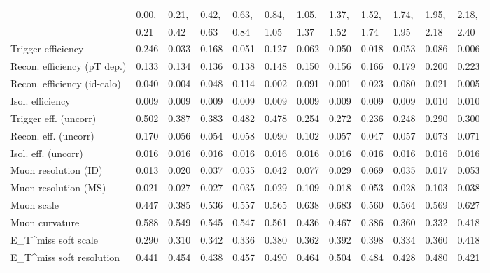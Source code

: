 \begin{tabular}{l|p{0.6cm}p{0.6cm}p{0.6cm}p{0.6cm}p{0.6cm}p{0.6cm}p{0.6cm}p{0.6cm}p{0.6cm}p{0.6cm}p{0.6cm}}
\hline
   & 0.00, & 0.21, & 0.42, & 0.63, & 0.84, & 1.05, & 1.37, & 1.52, & 1.74, & 1.95, & 2.18,  \\ 
   & 0.21 & 0.42 & 0.63 & 0.84 & 1.05 & 1.37 & 1.52 & 1.74 & 1.95 & 2.18 & 2.40  \\ 
\hline
Trigger efficiency                       & 0.246 & 0.033 & 0.168 & 0.051 & 0.127 & 0.062 & 0.050 & 0.018 & 0.053 & 0.086 & 0.006 \\
Recon. efficiency (pT dep.)              & 0.133 & 0.134 & 0.136 & 0.138 & 0.148 & 0.150 & 0.156 & 0.166 & 0.179 & 0.200 & 0.223 \\
Recon. efficiency (id-calo)              & 0.040 & 0.004 & 0.048 & 0.114 & 0.002 & 0.091 & 0.001 & 0.023 & 0.080 & 0.021 & 0.005 \\
Isol. efficiency                         & 0.009 & 0.009 & 0.009 & 0.009 & 0.009 & 0.009 & 0.009 & 0.009 & 0.009 & 0.010 & 0.010 \\
Trigger eff. (uncorr)                    & 0.502 & 0.387 & 0.383 & 0.482 & 0.478 & 0.254 & 0.272 & 0.236 & 0.248 & 0.290 & 0.300 \\
Recon. eff. (uncorr)                     & 0.170 & 0.056 & 0.054 & 0.058 & 0.090 & 0.102 & 0.057 & 0.047 & 0.057 & 0.073 & 0.071 \\
Isol. eff. (uncorr)                      & 0.016 & 0.016 & 0.016 & 0.016 & 0.016 & 0.016 & 0.016 & 0.016 & 0.016 & 0.016 & 0.016 \\
Muon resolution (ID)                     & 0.013 & 0.020 & 0.037 & 0.035 & 0.042 & 0.077 & 0.029 & 0.069 & 0.035 & 0.017 & 0.053 \\
Muon resolution (MS)                     & 0.021 & 0.027 & 0.027 & 0.035 & 0.029 & 0.109 & 0.018 & 0.053 & 0.028 & 0.103 & 0.038 \\
Muon scale                               & 0.447 & 0.385 & 0.536 & 0.557 & 0.565 & 0.638 & 0.683 & 0.560 & 0.564 & 0.569 & 0.627 \\
Muon curvature                           & 0.588 & 0.549 & 0.545 & 0.547 & 0.561 & 0.436 & 0.467 & 0.386 & 0.360 & 0.332 & 0.418 \\
E_{T}^{miss} soft scale                  & 0.290 & 0.310 & 0.342 & 0.336 & 0.380 & 0.362 & 0.392 & 0.398 & 0.334 & 0.360 & 0.418 \\
E_{T}^{miss} soft resolution             & 0.441 & 0.454 & 0.438 & 0.457 & 0.490 & 0.464 & 0.504 & 0.484 & 0.428 & 0.480 & 0.421 \\

\end{tabular}
